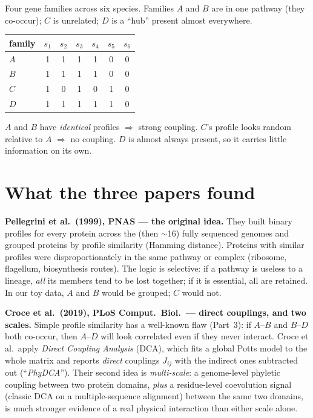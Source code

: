 \documentclass[11pt, oneside]{article}
\begin{document}
\begin{conceptbox}
Four gene families across six species. Families $A$ and $B$ are in one pathway (they
co-occur); $C$ is unrelated; $D$ is a ``hub'' present almost everywhere.
\begin{center}\small
\begin{tabular}{lcccccc}
\toprule
family & $s_1$ & $s_2$ & $s_3$ & $s_4$ & $s_5$ & $s_6$ \\
\midrule
$A$ & 1 & 1 & 1 & 1 & 0 & 0 \\
$B$ & 1 & 1 & 1 & 1 & 0 & 0 \\
$C$ & 1 & 0 & 1 & 0 & 1 & 0 \\
$D$ & 1 & 1 & 1 & 1 & 1 & 0 \\
\bottomrule
\end{tabular}
\end{center}
$A$ and $B$ have \emph{identical} profiles $\Rightarrow$ strong coupling. $C$'s profile looks
random relative to $A$ $\Rightarrow$ no coupling. $D$ is almost always present, so it carries
little information on its own.
\end{conceptbox}

\section{What the three papers found}

\textbf{Pellegrini et al.\ (1999), PNAS --- the original idea.} They built binary profiles for
every protein across the (then $\sim$16) fully sequenced genomes and grouped proteins by
profile similarity (Hamming distance). Proteins with similar profiles were disproportionately
in the same pathway or complex (ribosome, flagellum, biosynthesis routes). The logic is
selective: if a pathway is useless to a lineage, \emph{all} its members tend to be lost
together; if it is essential, all are retained. In our toy data, $A$ and $B$ would be grouped;
$C$ would not.

\textbf{Croce et al.\ (2019), PLoS Comput.\ Biol.\ --- direct couplings, and two scales.}
Simple profile similarity has a well-known flaw (Part~3): if $A$--$B$ and $B$--$D$ both
co-occur, then $A$--$D$ will look correlated even if they never interact. Croce et al.\ apply
\emph{Direct Coupling Analysis} (DCA), which fits a global Potts model to the whole matrix and
reports \emph{direct} couplings $J_{ij}$ with the indirect ones subtracted out
(``\emph{PhyDCA}''). Their second idea is \emph{multi-scale}: a genome-level phyletic coupling
between two protein domains, \emph{plus} a residue-level coevolution signal (classic DCA on a
multiple-sequence alignment) between the same two domains, is much stronger evidence of a real
physical interaction than either scale alone.
\end{document}
